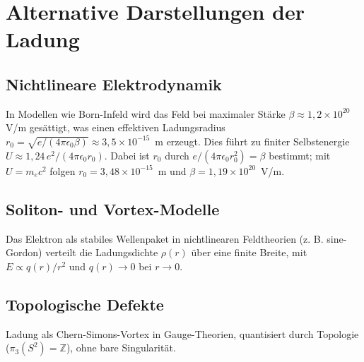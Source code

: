 	\section{Alternative Darstellungen der Ladung}
	\label{sec:alternativen}
	
	\subsection{Nichtlineare Elektrodynamik}
	In Modellen wie Born-Infeld wird das Feld bei maximaler Stärke $\beta \approx 1{,}2 \times 10^{20}$ V/m gesättigt, was einen effektiven Ladungsradius $r_0 = \sqrt{e/(4\pi\epsilon_0 \beta)} \approx 3{,}5 \times 10^{-15}$~m erzeugt. Dies führt zu finiter Selbstenergie $U \approx 1{,}24\, e^2 / (4\pi \epsilon_0 r_0)$. Dabei ist $r_0$ durch $e/(4\pi\epsilon_0 r_0^2) = \beta$ bestimmt; mit $U = m_e c^2$ folgen $r_0 = 3{,}48\times10^{-15}$~m und $\beta = 1{,}19\times10^{20}$~V/m.
	
	\subsection{Soliton- und Vortex-Modelle}
	Das Elektron als stabiles Wellenpaket in nichtlinearen Feldtheorien (z. B. sine-Gordon) verteilt die Ladungsdichte $\rho(r)$ über eine finite Breite, mit $E \propto q(r)/r^2$ und $q(r) \to 0$ bei $r \to 0$.
	
	\subsection{Topologische Defekte}
	Ladung als Chern-Simons-Vortex in Gauge-Theorien, quantisiert durch Topologie ($\pi_3(S^2) = \mathbb{Z}$), ohne bare Singularität.
	
	\begin{table}[h]
		\centering
		\caption{Vergleich alternativer Ladungsdarstellungen}
		\label{tab:vergleich}
	\end{table}
	
